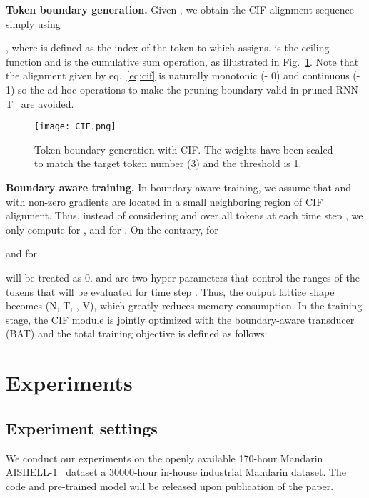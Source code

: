 \documentclass{INTERSPEECH2023}
\begin{document}
\textbf{Token boundary generation.} Given , we obtain the CIF alignment   sequence simply using 

, where  is defined as the index of the token to which  assigns. 
 is the ceiling function and  is the cumulative sum operation, as illustrated in Fig.~\ref{fig:cif}. Note that the alignment given by eq.~\ref{eq:cif} is naturally monotonic (- 0) and continuous (- 1) so the ad hoc operations to make the pruning boundary valid in pruned RNN-T~\cite{kuang2022pruned} are avoided.
\begin{figure}[]
  \centering
  \texttt{[image: CIF.png]}
  \caption{Token boundary generation with CIF. The weights have been scaled to match the target token number (3) and the threshold  is 1.}
  \label{fig:cif}
\end{figure}

\textbf{Boundary aware training.} In boundary-aware training, we assume that  and  with non-zero gradients are located in a small neighboring region of CIF alignment. Thus, instead of considering  and  over all  tokens at each time step , we only compute  for 
, and  for 
. 
On the contrary,  for 

and  for 

will be treated as 0.  
 and  are two hyper-parameters that control the ranges of the tokens that will be evaluated for time step . 
Thus, the output lattice shape becomes (N, T, , V), which greatly reduces memory consumption. 
In the training stage, the CIF module is jointly optimized with the boundary-aware transducer (BAT) and the total training objective is defined as follows:


\section{Experiments}
\subsection{Experiment settings}
\label{sec:set}
We conduct our experiments on the openly available 170-hour Mandarin AISHELL-1~\cite{aishell1} dataset a 30000-hour in-house industrial Mandarin dataset.  The code and pre-trained model will be released upon publication of the paper.
\end{document}
